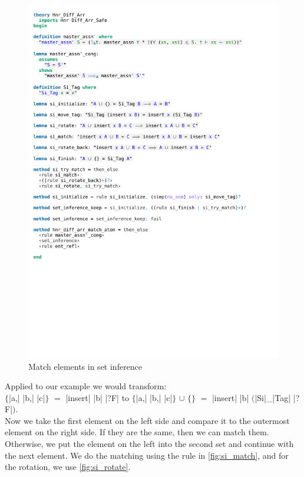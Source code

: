 \begin{figure}[htpb]
    \includegraphics[trim={0 18,4cm 0 10,8cm}, clip, width=1.00\textwidth]{figures/Theory_Hnr_Diff_Arr_SI.pdf}
    \caption[Match elements in set inference]{Match elements in set inference}
    \label{fig:si_match}
\end{figure}

\noindent Applied to our example we would transform: \\
$\{$|a,| |b,| |c|$\}$ $=$ |insert| |b| |?F| to $\{$|a,| |b,| |c|$\}$ $\cup$ $\{\}$ $=$ |insert| |b| $($|Si|\_|Tag| |?F|$)$.\\
Now we take the first element on the left side and compare it to the outermost element on the right side. If they are the same, then we can match them. Otherwise, we put the element on the left into the second set and continue with the next element. We do the matching using the rule in \autoref{fig:si_match}, and for the rotation, we use \autoref{fig:si_rotate}.

